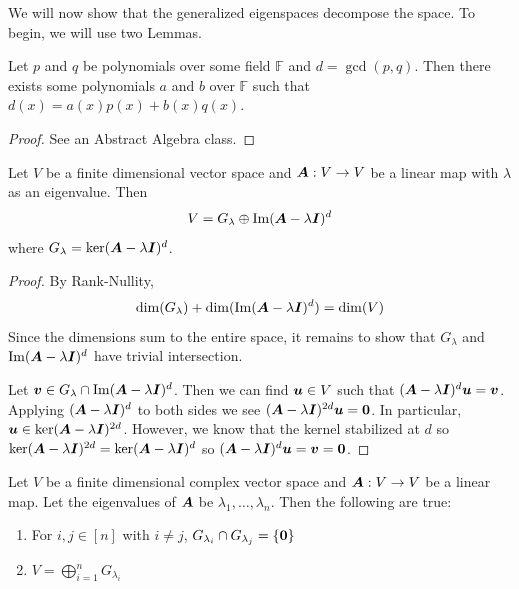 We will now show that the generalized eigenspaces decompose the space. To begin, we will use two Lemmas.

\begin{lemma}
    Let $p$ and $q$ be polynomials over some field $\mathbb{F}$ and $d=\gcd(p,q)$. Then there exists some polynomials $a$ and $b$ over $\mathbb{F}$ such that $d(x)=a(x)p(x)+b(x)q(x)$.
\end{lemma}

\begin{proof}
    See an Abstract Algebra class.
\end{proof}

\begin{lemma}
    Let $V$ be a finite dimensional vector space and $\boldsymbol{A}:V\to V$ be a linear map with $\lambda$ as an eigenvalue. Then
    \[
        V=G_{\lambda}\oplus \operatorname{Im}(\boldsymbol{A}-\lambda\boldsymbol{I})^{d}
    \]
    where $G_{\lambda}=\ker(\boldsymbol{A}-\lambda\boldsymbol{I})^{d}$.
\end{lemma}

\begin{proof}
    By Rank-Nullity,
    \[
        \dim(G_{\lambda})+\dim(\operatorname{Im}(\boldsymbol{A}-\lambda\boldsymbol{I})^d)=\dim(V)
    \]
    Since the dimensions sum to the entire space, it remains to show that $G_{\lambda}$ and $\operatorname{Im}(\boldsymbol{A}-\lambda\boldsymbol{I})^d$ have trivial intersection.

    Let $\boldsymbol{v}\in G_{\lambda}\cap \operatorname{Im}(\boldsymbol{A}-\lambda\boldsymbol{I})^d$. Then we can find $\boldsymbol{u}\in V$ such that $(\boldsymbol{A}-\lambda\boldsymbol{I})^d\boldsymbol{u}=\boldsymbol{v}$. Applying $(\boldsymbol{A}-\lambda\boldsymbol{I})^d$ to both sides we see $(\boldsymbol{A}-\lambda\boldsymbol{I})^{2d}\boldsymbol{u}=\boldsymbol{0}$. In particular, $\boldsymbol{u}\in\ker(\boldsymbol{A}-\lambda\boldsymbol{I})^{2d}$. However, we know that the kernel stabilized at $d$ so $\ker(\boldsymbol{A}-\lambda\boldsymbol{I})^{2d}=\ker(\boldsymbol{A}-\lambda\boldsymbol{I})^{d}$ so $(\boldsymbol{A}-\lambda\boldsymbol{I})^d\boldsymbol{u}=\boldsymbol{v}=\boldsymbol{0}$.
\end{proof}

\begin{theorem}
    Let $V$ be a finite dimensional complex vector space and $\boldsymbol{A}:V\to V$ be a linear map. Let the eigenvalues of $\boldsymbol{A}$ be $\lambda_1,\dots,\lambda_n$. Then the following are true:
    \begin{enumerate}
        \item For $i,j\in[n]$ with $i\neq j$, $G_{\lambda_i}\cap G_{\lambda_j}=\{\boldsymbol{0}\}$
        \item $V=\bigoplus_{i=1}^n G_{\lambda_i}$
    \end{enumerate}
\end{theorem}

